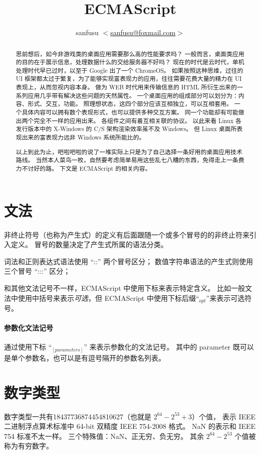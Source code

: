 \documentclass[UTF8]{ctexart}
\title{ECMAScript}
\author{sanfusu $<$\href{mailto:sanfusu@foxmail.com}{sanfusu@foxmail.com}$>$}
\begin{document}
\maketitle
\begin{abstract}
思前想后，如今非游戏类的桌面应用需要那么高的性能要求吗？
一般而言，桌面类应用的目的在于展示信息，处理数据什么的交给服务器不好吗？
现在的时代是云时代，单机处理时代早已过时，以至于 Google 出了一个 ChromeOS。
如果按照这种思维，过往的 UI 框架都太过于繁复，为了能够实现富表现力的应用，往往需要花费大量的精力在 UI 表现上，从而忽视内容本身。
做为 WEB 时代用来传输信息的 HTML 所衍生出来的一系列应用几乎带有解决这些问题的天然属性。
一个桌面应用的组成部分可以划分为：内容、形式、交互，功能。
照理想状态，这四个部分应该互相独立，可以互相套用。
一个具体内容可以拥有数个表现形式，也可以提供多种交互方案。
同一个功能却有可能做出两个完全不一样的应用出来。
各组件之间有着互相关联的协议。
以此来看 Linux 各发行版本中的 X-Windows 的 C/S 架构渲染效率虽不及 Windows。
但 Linux 桌面所表现出来的富表现力远非 Windows 系统所能比的。

以上到此为止，吧啦吧啦的说了一堆实际上只是为了自己选择一条好用的桌面应用技术路线。
当然本人菜鸟一枚，自然要考虑简单易用这些乱七八糟的东西，免得走上一条费力不讨好的路。
下文是 ECMAScript 的相关内容。
\end{abstract}


\section{文法}
非终止符号（也称为产生式）的定义有后面跟随一个或多个冒号的的非终止符来引入定义。
冒号的数量决定了产生式所属的语法分类。

词法和正则表达式语法使用 ``::'' 两个冒号区分；
数值字符串语法的产生式则使用三个冒号 ``:::'' 区分；

和其他文法记号不一样，ECMAScript 中使用下标来表示特定含义。
比如一般文法中使用中括号来表示\emph{可选}，但 ECMAScript 中使用下标后缀``${}_{opt}$''来表示可选符号。

\paragraph{参数化文法记号}
通过使用下标 ``${}_{[parameters]}$'' 来表示参数化的文法记号。
其中的 parameter 既可以是单个参数名，也可以是有逗号隔开的参数名列表。

\section{数字类型}
数字类型一共有18437736874454810627（也就是 $2^{64}-2^{53}+3$）个值，
表示 IEEE 二进制浮点算术标准中 64-bit 双精度 IEEE 754-2008 格式。
NaN 的表示和 IEEE 754 标准不太一样。
三个特殊值：NaN、正无穷、负无穷。
其余 $2^{64}-2^{53}$ 个值被称为有穷数字。
\end{document}
